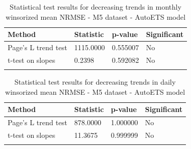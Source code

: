 \begin{table}[h]
\caption{Statistical test results for decreasing trends in monthly winsorized mean NRMSE - M5 dataset - AutoETS model}\label{tab:monthly_test_M5_AutoETS}
\begin{tabular}{@{}llll@{}}
\toprule
Method & Statistic & p-value & Significant \\
\midrule
Page's L trend test & 1115.0000 & 0.555007 & No \\
t-test on slopes & 0.2398 & 0.592082 & No \\
\botrule
\end{tabular}
\end{table}

\begin{table}[h]
\caption{Statistical test results for decreasing trends in daily winsorized mean NRMSE - M5 dataset - AutoETS model}\label{tab:monthly_test_M5_AutoETS}
\begin{tabular}{@{}llll@{}}
\toprule
Method & Statistic & p-value & Significant \\
\midrule
Page's L trend test & 878.0000 & 1.000000 & No \\
t-test on slopes & 11.3675 & 0.999999 & No \\
\botrule
\end{tabular}
\end{table}

